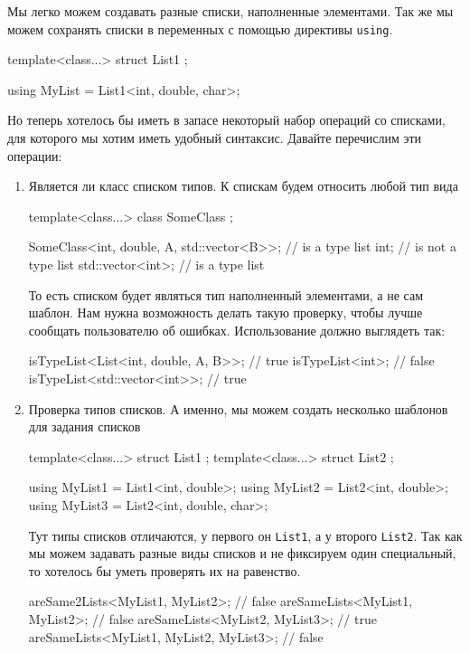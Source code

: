 Мы легко можем создавать разные списки, наполненные элементами.
Так же мы можем сохранять списки в переменных с помощью директивы \verb"using".
\begin{cppcode}
template<class...>
struct List1 {};

using MyList = List1<int, double, char>;
\end{cppcode}
Но теперь хотелось бы иметь в запасе некоторый набор операций со списками, для которого мы хотим иметь удобный синтаксис.
Давайте перечислим эти операции:
\begin{enumerate}
\item Является ли класс списком типов.
К спискам будем относить любой тип вида
\begin{cppcode}
template<class...>
class SomeClass {};

SomeClass<int, double, A, std::vector<B>>; // is a type list
int;                                       // is not a type list
std::vector<int>;                          // is a type list
\end{cppcode}
То есть списком будет являться тип наполненный элементами, а не сам шаблон.
Нам нужна возможность делать такую проверку, чтобы лучше сообщать пользователю об ошибках.
Использование должно выглядеть так:
\begin{cppcode}
isTypeList<List<int, double, A, B>>; // true
isTypeList<int>;                     // false
isTypeList<std::vector<int>>;        // true
\end{cppcode}

\item Проверка типов списков.
А именно, мы можем создать несколько шаблонов для задания списков
\begin{cppcode}
template<class...>
struct List1 {};
template<class...>
struct List2 {};

using MyList1 = List1<int, double>;
using MyList2 = List2<int, double>;
using MyList3 = List2<int, double, char>;
\end{cppcode}
Тут типы списков отличаются, у первого он \verb"List1", а у второго \verb"List2".
Так как мы можем задавать разные виды списков и не фиксируем один специальный, то хотелось бы уметь проверять их на равенство.
\begin{cppcode}
areSame2Lists<MyList1, MyList2>;         // false
areSameLists<MyList1, MyList2>;          // false
areSameLists<MyList2, MyList3>;          // true
areSameLists<MyList1, MyList2, MyList3>; // false
\end{cppcode}


\end{enumerate}
